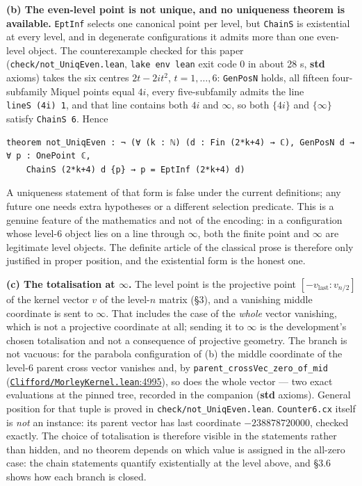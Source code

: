 \documentclass[11pt]{article}
\theoremstyle{definition}
\theoremstyle{remark}
\begin{document}
\textbf{(b) The even-level point is not unique, and no uniqueness theorem is available.} \texttt{EptInf} selects one
canonical point per level, but \texttt{ChainS} is existential at every level, and in degenerate configurations it
admits more than one even-level object. The counterexample checked for this paper
(\texttt{check/\allowbreak not\_\allowbreak UniqEven.\allowbreak lean}, \texttt{lake\ env\ lean} exit code 0 in about 28 s, \textbf{std} axioms) takes the six
centres \(2t - 2it^2\), \(t = 1, \dots, 6\): \texttt{GenPosN} holds, all fifteen four-subfamily Miquel points equal
\(4i\), every five-subfamily admits the line \texttt{lineS\ (4i)\ 1}, and that line contains both \(4i\) and $\infty$, so both
\(\{4i\}\) and \(\{\infty\}\) satisfy \texttt{ChainS\ 6}. Hence

\begin{Verbatim}
theorem not_UniqEven : ¬ (∀ (k : ℕ) (d : Fin (2*k+4) → ℂ), GenPosN d → ∀ p : OnePoint ℂ,
    ChainS (2*k+4) d {p} → p = EptInf (2*k+4) d)
\end{Verbatim}

A uniqueness statement of that form is false under the current definitions; any future one needs extra
hypotheses or a different selection predicate. This is a genuine feature of the mathematics and not of the
encoding: in a configuration whose level-6 object lies on a line through $\infty$, both the finite point and $\infty$ are
legitimate level objects. The definite article of the classical prose is therefore only justified in
proper position, and the existential form is the honest one.

\textbf{(c) The totalisation at $\infty$.} The level point is the projective point \([-v_{\mathrm{last}} : v_{n/2}]\) of
the kernel vector \(v\) of the level-\(n\) matrix (\S{}3), and a vanishing middle coordinate is sent to $\infty$. That
includes the case of the \emph{whole} vector vanishing, which is not a projective coordinate at all; sending it
to $\infty$ is the development's chosen totalisation and not a consequence of projective geometry. The branch is
not vacuous: for the parabola configuration of (b) the middle coordinate of the level-6 parent cross vector
vanishes and, by \texttt{parent\_\allowbreak crossVec\_\allowbreak zero\_\allowbreak of\_\allowbreak mid} (\href{https://github.com/jpbald93/paperl_clifford_chain/blob/e1ae145c2565cc98816635387412edc0a740c27c/Clifford/MorleyKernel.lean\#L4995}{\texttt{Clifford/\allowbreak MorleyKernel.lean}:4995}), so does the whole
vector --- two exact evaluations at the pinned tree, recorded in the companion (\textbf{std} axioms). General
position for that tuple is proved in \texttt{check/\allowbreak not\_\allowbreak UniqEven.\allowbreak lean}. \texttt{Counter6.\allowbreak cx} itself is \emph{not} an instance:
its parent vector has last coordinate \(-238878720000\), checked exactly. The choice of totalisation is
therefore visible in the statements rather than hidden, and no theorem depends on which value is assigned
in the all-zero case: the chain statements quantify existentially at the level above, and \S{}3.6 shows how
each branch is closed.
\end{document}
